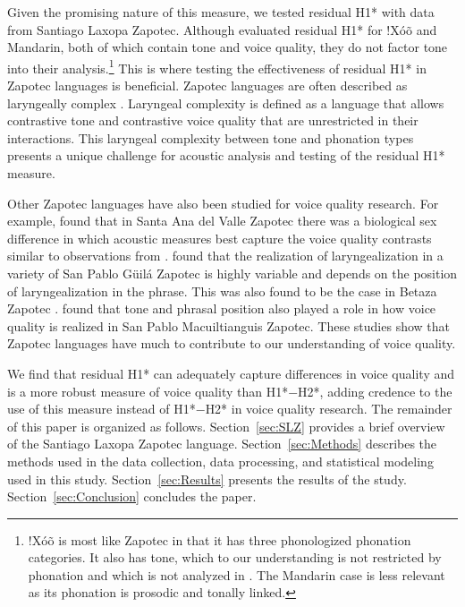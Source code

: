 Given the promising nature of this measure, we tested residual H1* with data from Santiago Laxopa Zapotec. Although \citet{chaiH1H2Acoustic2022} evaluated residual H1* for !Xóõ and Mandarin, both of which contain tone and voice quality, they do not factor tone into their analysis.\footnote{!Xóõ is most like Zapotec in that it has three phonologized phonation categories. It also has tone, which to our understanding is not restricted by phonation and which is not analyzed in \citet{chaiH1H2Acoustic2022}. The Mandarin case is less relevant as its phonation is prosodic and tonally linked.} This is where testing the effectiveness of residual H1* in Zapotec languages is beneficial. Zapotec languages are often described as laryngeally complex \citep{silvermanLaryngealComplexityOtomanguean1997,ariza-garciaPhonationTypesTones2018}. Laryngeal complexity is defined as a language that allows contrastive tone and contrastive voice quality that are unrestricted in their interactions. This laryngeal complexity between tone and phonation types presents a unique challenge for acoustic analysis and testing of the residual H1* measure. 

Other Zapotec languages have also been studied for voice quality research. For example, \citet{espositoVariationContrastivePhonation2010} found that in Santa Ana del Valle Zapotec there was a biological sex difference in which acoustic measures best capture the voice quality contrasts similar to observations from \citet{klattAnalysisSynthesisPerception1990}. \citet{arellanesarellanesDosGradosLaringizacion2010} found that the realization of laryngealization in a variety of San Pablo Güilá Zapotec is highly variable and depends on the position of laryngealization in the phrase. This was also found to be the case in Betaza Zapotec \citep{crowhurstInfluenceVowelLaryngealisation2016}. \citet{barzilaiContextdependentPhoneticEnhancement2021} found that tone and phrasal position also played a role in how voice quality is realized in San Pablo Macuiltianguis Zapotec. These studies show that Zapotec languages have much to contribute to our understanding of voice quality. 

We find that residual H1* can adequately capture differences in voice quality and is a more robust measure of voice quality than H1*$-$H2*, adding credence to the use of this measure instead of H1*$-$H2* in voice quality research. The remainder of this paper is organized as follows. Section~\ref{sec:SLZ} provides a brief overview of the Santiago Laxopa Zapotec language. Section~\ref{sec:Methods} describes the methods used in the data collection, data processing, and statistical modeling used in this study. Section~\ref{sec:Results} presents the results of the study. Section~\ref{sec:Conclusion} concludes the paper.

